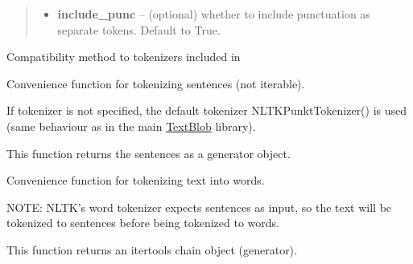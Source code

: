 \documentclass[letterpaper,10pt,english]{sphinxmanual}
\begin{document}
\begin{fulllineitems}
\begin{fulllineitems}
\begin{quote}
\begin{description}
\begin{itemize}
\item {} 
\textbf{include\_punc} -- (optional) whether to include punctuation as separate
tokens. Default to True.

\end{itemize}

\end{description}\end{quote}

\end{fulllineitems}


\begin{fulllineitems}
\label{api_reference:textblob_de.tokenizers.WordTokenizer.word_tokenize}
Compatibility method to tokenizers included in 

\end{fulllineitems}


\end{fulllineitems}


\begin{fulllineitems}
\label{api_reference:textblob_de.tokenizers.sent_tokenize}
Convenience function for tokenizing sentences (not iterable).

If tokenizer is not specified, the default tokenizer NLTKPunktTokenizer()
is used (same behaviour as in the main \href{http://textblob.readthedocs.org/}{TextBlob} library).

This function returns the sentences as a generator object.

\end{fulllineitems}


\begin{fulllineitems}
\label{api_reference:textblob_de.tokenizers.word_tokenize}
Convenience function for tokenizing text into words.

NOTE: NLTK's word tokenizer expects sentences as input, so the text will be
tokenized to sentences before being tokenized to words.

This function returns an itertools chain object (generator).

\end{fulllineitems}
\end{document}
